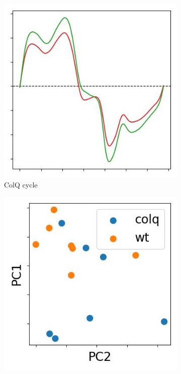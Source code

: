 \begin{figure}[t]
  \centering
  \begin{subfigure}[b]{0.15\textwidth}
    \centering
    \includegraphics[width = \textwidth]{pictures/exp_1_cycle_example.jpeg}
    \caption{ColQ cycle}
    \label{fig:colq-cycle}
  \end{subfigure}
  \begin{subfigure}[b]{0.15\textwidth}
    \centering
    \includegraphics[width = \textwidth]{pictures/exp_1_scatter.jpeg}

\end{subfigure}
\end{figure}
